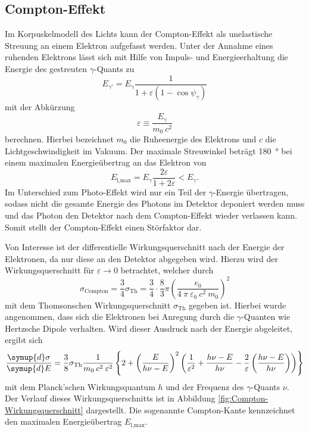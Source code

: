 \subsection{Compton-Effekt}
\label{sec:Compton-Effekt}

Im Korpuskelmodell des Lichts kann der Compton-Effekt als unelastische
Streuung an einem Elektron aufgefasst werden.
Unter der Annahme eines ruhenden Elektrons lässt sich mit Hilfe von Impuls-
und Energieerhaltung die Energie des gestreuten $\gamma$-Quants zu
\begin{equation}
	E_{\gamma'} = E_\gamma
	\frac{1}{1 + \varepsilon \left(1 - \cos \psi_\gamma\right)}
	\label{eqn:Compton-Energy}
\end{equation}
mit der Abkürzung
\begin{equation*}
	\varepsilon \equiv \frac{E_\gamma}{m_\text{0}\:c^2}
\end{equation*}
berechnen.
Hierbei bezeichnet $m_0$ die Ruheenergie des Elektrons und
$c$ die Lichtgeschwindigkeit im Vakuum.
Der maximale Streuwinkel beträgt \SI{180}{\degree} bei einem maximalen
Energieübertrag an das Elektron von
\begin{equation*}
	E_\text{l,max} = E_\gamma \frac{2 \varepsilon}{1 + 2 \varepsilon} < E_\gamma.
\end{equation*}
Im Unterschied zum Photo-Effekt wird nur ein Teil der $\gamma$-Energie übertragen,
sodass nicht die gesamte Energie des Photons im Detektor deponiert werden muss und
das Photon den Detektor nach dem Compton-Effekt wieder verlassen kann.
Somit stellt der Compton-Effekt einen Störfaktor dar.

Von Interesse ist der differentielle Wirkungsquerschnitt nach der Energie der
Elektronen, da nur diese an den Detektor abgegeben wird. Hierzu
wird der Wirkungsquerschnitt für $\varepsilon \rightarrow 0$ betrachtet,
welcher durch
\begin{equation*}
	\sigma_\text{Compton} = \frac{3}{4} \sigma_\text{Th}
	= \frac{3}{4} \cdot \frac{8}{3} \pi
	\left(\frac{e_0}{4\:\pi\:\varepsilon_0\:c^2\:m_0}\right)^2
\end{equation*}
mit dem Thomsonschen Wirkungsquerschnitt $\sigma_\text{Th}$ gegeben ist.
Hierbei wurde angenommen, dass sich die Elektronen bei Anregung durch die
$\gamma$-Quanten wie Hertzsche Dipole verhalten.
Wird dieser Ausdruck nach der Energie abgeleitet, ergibt sich
\begin{equation}
	\frac{\symup{d}\sigma}{\symup{d}E} =
	\frac{3}{8} \sigma_\text{Th} \frac{1}{m_0\:c^2\:\varepsilon^2}
	\left\{2 + \left(\frac{E}{h \nu - E}\right)^2
	\left(\frac{1}{\varepsilon^2} + \frac{h \nu - E}{h \nu} - \frac{2}{\varepsilon}
	\left(\frac{h \nu - E}{h \nu}\right)\right)\right\}
	\label{eqn:Compton-Wirkungsquerschnitt}
\end{equation}
mit dem Planck'schen Wirkungsquantum $h$ und der Frequenz des $\gamma$-Quants $\nu$.
Der Verlauf dieses Wirkungsquerschnitts ist in Abbildung \ref{fig:Compton-Wirkungsquerschnitt}
dargestellt. Die sogenannte Compton-Kante kennzeichnet den maximalen Energieübertrag
$E_\text{l,max}$.

